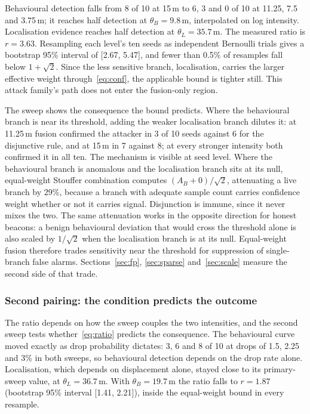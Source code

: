 Behavioural detection falls from 8 of 10 at 15\,m to 6, 3 and 0 of 10 at 11.25,
7.5 and 3.75\,m; it reaches half detection at $\theta_B = 9.8$\,m, interpolated
on log intensity. Localisation evidence reaches half detection at
$\theta_L = 35.7$\,m. The measured ratio is $r = 3.63$. Resampling each level's
ten seeds as independent Bernoulli trials gives a bootstrap 95\% interval of
[2.67, 5.47], and fewer than 0.5\% of resamples fall below $1+\sqrt2$. Since
the less sensitive branch, localisation, carries the larger effective weight
through~\eqref{eq:conf}, the applicable bound is tighter still. This attack
family's path does not enter the fusion-only region.

The sweep shows the consequence the bound predicts. Where the behavioural
branch is near its threshold, adding the weaker localisation branch dilutes
it: at 11.25\,m fusion confirmed the attacker in 3 of 10 seeds against 6 for
the disjunctive rule, and at 15\,m in 7 against 8; at every stronger intensity
both confirmed it in all ten. The mechanism is visible at seed level. Where the
behavioural branch is anomalous and the localisation branch sits at its null,
equal-weight Stouffer combination computes $(A_B + 0)/\sqrt2$, attenuating a
live branch by 29\%, because a branch with adequate sample count carries
confidence weight whether or not it carries signal. Disjunction is immune,
since it never mixes the two. The same attenuation works in the opposite
direction for honest beacons: a benign behavioural deviation that would cross
the threshold alone is also scaled by $1/\sqrt2$ when the localisation branch
is at its null. Equal-weight fusion therefore trades sensitivity near the
threshold for suppression of single-branch false alarms. Sections~\ref{sec:fp},
\ref{sec:sparse} and~\ref{sec:scale} measure the second side of that trade.

\subsubsection{Second pairing: the condition predicts the outcome}

The ratio depends on how the sweep couples the two intensities, and the second
sweep tests whether~\eqref{eq:ratio} predicts the consequence. The behavioural
curve moved exactly as drop probability dictates: 3, 6 and 8 of 10 at drops of
1.5, 2.25 and 3\% in both sweeps, so behavioural detection depends on the drop
rate alone. Localisation, which depends on displacement alone, stayed close
to its primary-sweep value, at $\theta_L = 36.7$\,m. With $\theta_B = 19.7$\,m the ratio falls to $r = 1.87$
(bootstrap 95\% interval [1.41, 2.21]), inside the equal-weight bound in every
resample.

